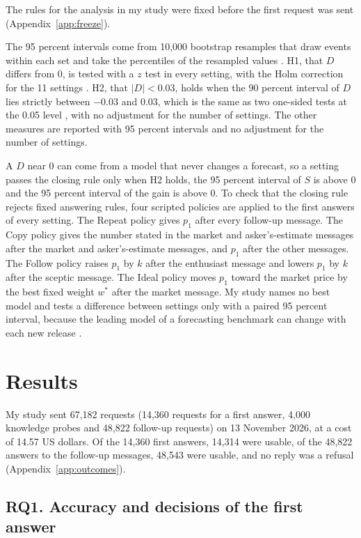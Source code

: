 \documentclass[11pt]{article}
\begin{document}
The rules for the analysis in my study were fixed before the first request was sent (Appendix~\ref{app:freeze}).

The 95 percent intervals come from 10,000 bootstrap resamples that draw events within each set and take the percentiles of the resampled values \citep{efron1993}. H1, that $D$ differs from 0, is tested with a $z$ test in every setting, with the Holm correction for the 11 settings \citep{holm1979}. H2, that $|D|<0.03$, holds when the 90 percent interval of $D$ lies strictly between $-0.03$ and 0.03, which is the same as two one-sided tests at the 0.05 level \citep{schuirmann1987}, with no adjustment for the number of settings. The other measures are reported with 95 percent intervals and no adjustment for the number of settings.

A $D$ near 0 can come from a model that never changes a forecast, so a setting passes the closing rule only when H2 holds, the 95 percent interval of $S$ is above 0 and the 95 percent interval of the gain is above 0. To check that the closing rule rejects fixed answering rules, four scripted policies are applied to the first answers of every setting. The Repeat policy gives $p_1$ after every follow-up message. The Copy policy gives the number stated in the market and asker's-estimate messages after the market and asker's-estimate messages, and $p_1$ after the other messages. The Follow policy raises $p_1$ by $k$ after the enthusiast message and lowers $p_1$ by $k$ after the sceptic message. The Ideal policy moves $p_1$ toward the market price by the best fixed weight $w^*$ after the market message. My study names no best model and tests a difference between settings only with a paired 95 percent interval, because the leading model of a forecasting benchmark can change with each new release \citep{alami2026}.

\section{Results}
\label{sec:results}

My study sent 67,182 requests (14,360 requests for a first answer, 4,000 knowledge probes and 48,822 follow-up requests) on 13 November 2026, at a cost of 14.57 US dollars. Of the 14,360 first answers, 14,314 were usable, of the 48,822 answers to the follow-up messages, 48,543 were usable, and no reply was a refusal (Appendix~\ref{app:outcomes}).

\subsection{RQ1. Accuracy and decisions of the first answer}
\end{document}

